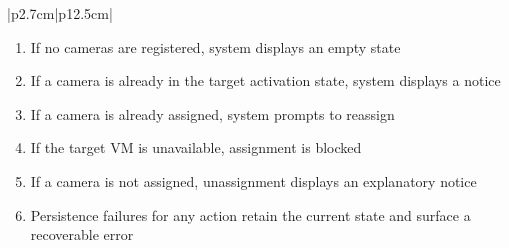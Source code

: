 \begin{table}[H]
\begin{tabular}{|p{2.7cm}|p{12.5cm}|}
\begin{minipage}[t]{\linewidth}
\begin{enumerate}[topsep=0pt,itemsep=1pt,parsep=0pt,partopsep=0pt]
                \item If no cameras are registered, system displays an empty state
                \item If a camera is already in the target activation state, system displays a notice
                \item If a camera is already assigned, system prompts to reassign
                \item If the target VM is unavailable, assignment is blocked
                \item If a camera is not assigned, unassignment displays an explanatory notice
                \item Persistence failures for any action retain the current state and surface a recoverable error
            \end{enumerate}
        \end{minipage} \\
        \hline
    \end{tabular}
    \label{tab:admin-manage-cameras}
\end{table}
